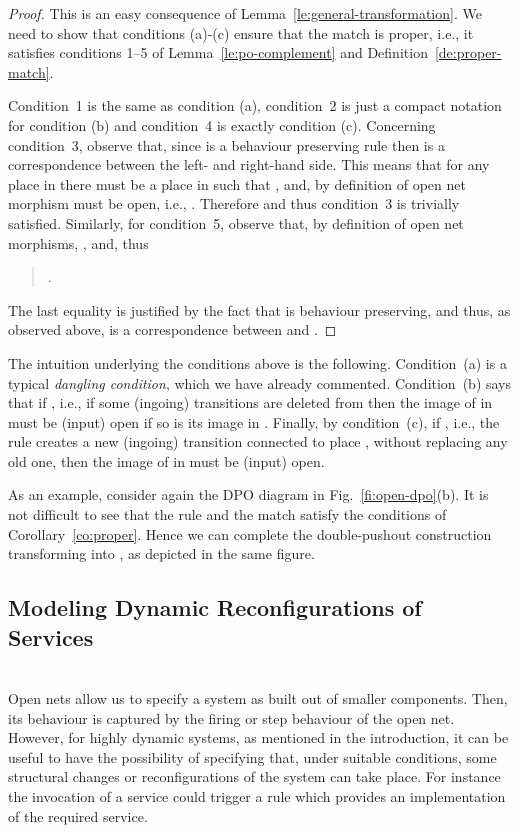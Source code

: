 \documentclass{LMCS}
\begin{document}
\begin{proof}
  This is an easy consequence of Lemma~\ref{le:general-transformation}.
We need to show that conditions (a)-(c) ensure that the match 
  is proper, i.e., it satisfies conditions 1--5 of
  Lemma~\ref{le:po-complement} and Definition~\ref{de:proper-match}.
  
  Condition~1 is the same as condition (a), condition~2 is just a
  compact notation for condition (b) and condition~4 is exactly
  condition (c).
Concerning condition~3, observe that, since  is a behaviour
  preserving rule then  is a
  correspondence between the left- and right-hand side. 
This means
  that for any place  in  there must be a place  in
   such that , and, by definition of open net
  morphism  must be open, i.e., . Therefore
   and thus condition~3 is
  trivially satisfied.  
Similarly, for condition~5, observe that, by definition of open net
  morphisms, , and, thus
  \begin{quote}
    .
  \end{quote}
  The last equality is justified by the fact that  is behaviour
  preserving, and thus, as observed above,  is a correspondence between  and .
\end{proof}

The intuition underlying the conditions above is the following.
Condition~(a) is a typical \emph{dangling condition}, which we have already commented.
Condition~(b) says that if , i.e., if some
(ingoing) transitions are deleted from  then the image of  
in  must be (input) open if so is its image in .
Finally, by condition~(c), if , i.e., the rule
 creates a new (ingoing) transition connected to place ,
without replacing any old one, then the image of  in 
must be (input) open.


As an example, consider again the DPO diagram in Fig.~\ref{fi:open-dpo}(b).
It is not difficult to see that the rule and the match
satisfy the conditions of Corollary~\ref{co:proper}. Hence we can
complete the double-pushout construction transforming  
 into , as depicted in the same figure.

\subsection{Modeling Dynamic Reconfigurations of Services}
\ \\

\noindent
Open nets allow us to specify a system as built out of smaller
components. Then, its behaviour is captured by the firing or step
behaviour of the open net. However, for highly dynamic systems, as
mentioned in the introduction, it can be useful to have the
possibility of specifying that, under suitable conditions, some
structural changes or reconfigurations of the system can take place.
For instance
the invocation of a service
could trigger a rule which provides an implementation of the required service.
\end{document}
